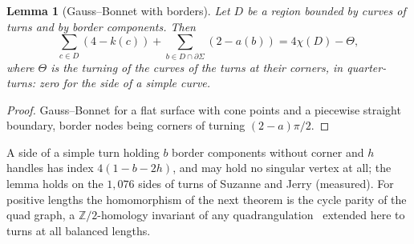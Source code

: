 \documentclass[11pt,a4paper]{article}
\newtheorem{lemma}{Lemma}
\newcommand{\Z}{\mathbb{Z}}
\newenvironment{evidence}[3][]{}{}
\begin{document}
\begin{evidence}{tested}{at $\Theta = 0$ and without border, 3{,}833 regions of 50 random instances; the border term is not tested}
\begin{lemma}[Gauss--Bonnet with borders]\label{lem:gauss-border}
Let $D$ be a region bounded by curves of turns and by border components. Then
\[
  \sum_{c \in D} (4 - k(c)) + \sum_{b \in D \cap \partial\Sigma} (2 - a(b))
  = 4\chi(D) - \Theta,
\]
where $\Theta$ is the turning of the curves of the turns at their corners, in
quarter-turns: zero for the side of a simple curve.
\end{lemma}
\end{evidence}
\begin{proof}
Gauss--Bonnet for a flat surface with cone points and a piecewise straight
boundary, border nodes being corners of turning $(2 - a)\pi/2$.
\end{proof}

A side of a simple turn holding $b$ border components without corner and $h$
handles has index $4(1 - b - 2h)$, and may hold no singular vertex at all; the
lemma holds on the $1{,}076$ sides of turns of Suzanne and Jerry (measured).
For positive lengths the homomorphism of the next theorem is the cycle parity
of the quad graph, a $\Z/2$-homology invariant of any
quadrangulation~\cite[Lemma~3.1]{kaiser2015colouring}
extended here to turns at all balanced
lengths.
\end{document}
